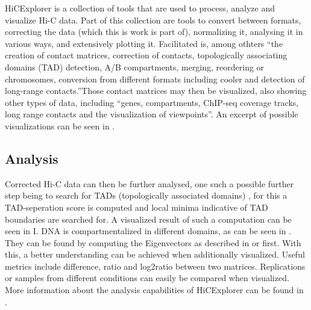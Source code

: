 HiCExplorer \cite{wolff2018galaxy} is a collection of tools that are used to
process, analyze and visualize Hi-C data. Part of this collection are tools to
convert between formats, correcting the data (which this is work is part of),
normalizing it, analysing it in various ways, and extensively plotting it.
Facilitated is, among othters ``the creation of contact matrices, correction of
contacts, topologically associating domains (TAD) detection, A/B compartments,
merging, reordering or chromosomes, conversion from different formats including
cooler and detection of long-range contacts.''\footnotemark Those contact
matrices may then be visualized, also showing other types of data, including
``genes, compartments, ChIP-seq coverage tracks, long range contacts and the
visualization of viewpoints''\footnotemark[\value{footnote}]. An excerpt of
possible visualizations can be seen in .



\subsection{Analysis}\label{sec:analysis}



Corrected Hi-C data can then be further analysed, one such a possible further
step being to search for TADs (topologically associated domains)
\cite{ramirez2018high}, for this a TAD-seperation score is computed and local
minima indicative of TAD boundaries are searched for. A visualized result of
such a computation can be seen in I. DNA is
compartmentalized \cite{lieberman2009comprehensive} in different domains, as
can be seen in . They can be found by computing
the Eigenvectors as described in \cite{lieberman2009comprehensive} or
\cite{imakaev2012iterative} first. With this, a better understanding can be
achieved when additionally visualized. Useful metrics include difference, ratio
and log2ratio between two matrices. Replications or samples from different
conditions can easily be compared when visualized. More information about the
analysis capabilities of HiCExplorer can be found in \cite{wolff2018galaxy}.




